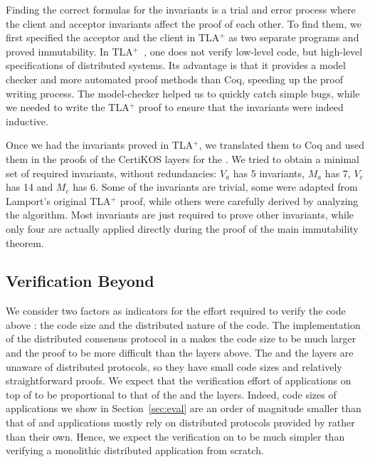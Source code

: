 \def\tlaplus{TLA$^+$\xspace}

Finding the correct formulas for the invariants is a trial and error process
where the client and acceptor invariants affect the proof of each other. To find
them, we first specified the acceptor and the client in \tlaplus as two separate
programs and proved immutability. In \tlaplus~\cite{tlaproofs}, one does not
verify low-level code, but high-level specifications of distributed systems. Its
advantage is that it provides a model checker and more automated proof methods
than Coq, speeding up the proof writing process. The model-checker helped us to
quickly catch simple bugs, while we needed to write the \tlaplus proof to ensure that the invariants were indeed inductive.

Once we had the invariants proved in \tlaplus, we translated them to Coq and
used them in the proofs of the CertiKOS layers for the \WOR{}. We tried to
obtain a minimal set of required invariants, without redundancies: $V_a$ has 5
invariants, $M_a$ has 7, $V_c$ has 14 and $M_c$ has 6. Some of the invariants
are trivial, some were adapted from Lamport's original \tlaplus proof, while
others were carefully derived by analyzing the algorithm. Most invariants are
just required to prove other invariants, while only four are actually applied
directly during the proof of the main immutability theorem.

\subsection{Verification Beyond \sysname{}}

We consider two factors as indicators for the effort required to verify the code
above \sysname{}: the code size and the distributed nature of the code. The
implementation of the distributed consensus protocol in a \WOR{} makes the code
size to be much larger and the proof to be more difficult than the layers above.
The \WOS{} and the \wormspace{} layers are unaware of distributed protocols, so
they have small code sizes and relatively straightforward proofs. We expect that
the verification effort of applications on top of \sysname{} to be proportional
to that of the \WOS{} and the \wormspace{} layers. Indeed, code sizes of
applications we show in Section~\ref{sec:eval} are an order of magnitude smaller
than that of \sysname{} and applications mostly rely on distributed protocols
provided by \sysname{} rather than their own. Hence, we expect the verification
on \sysname{} to be much simpler than verifying a monolithic distributed
application from scratch.

